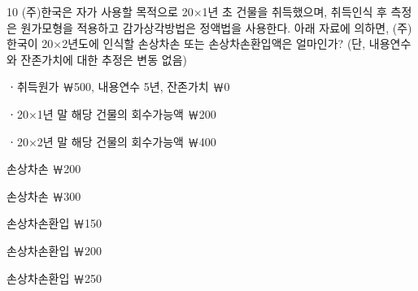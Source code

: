 \begin{question}{10}
(주)한국은 자가 사용할 목적으로 20×1년 초 건물을 취득했으며, 취득인식 후 측정은 원가모형을 적용하고 감가상각방법은 정액법을 사용한다. 아래 자료에 의하면, (주)한국이 20×2년도에 인식할 손상차손 또는 손상차손환입액은 얼마인가? (단, 내용연수와 잔존가치에 대한 추정은 변동 없음)
\begin{framedtext}
ㆍ취득원가 ￦500, 내용연수 5년, 잔존가치 ￦0 \par
ㆍ20×1년 말 해당 건물의 회수가능액 ￦200 \par
ㆍ20×2년 말 해당 건물의 회수가능액 ￦400 \par
\end{framedtext}
\begin{choices}
  \item 손상차손 ￦200
  \item 손상차손 ￦300
  \item 손상차손환입 ￦150
  \item 손상차손환입 ￦200
  \item 손상차손환입 ￦250
\end{choices}
\end{question}
